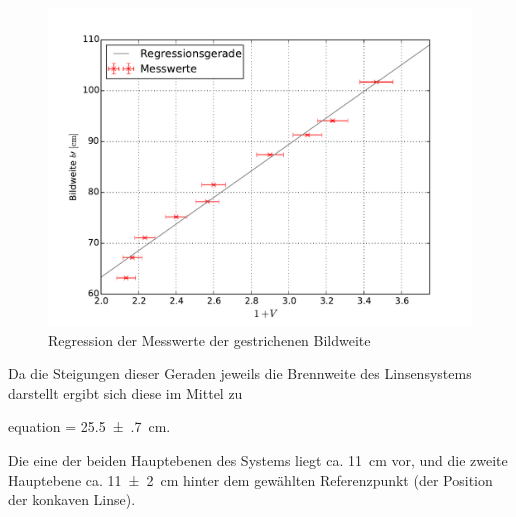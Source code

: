 	\begin{figure}[!h]
		\centering
		\includegraphics[scale=.7]{Grafiken/Messwerte_Abbe1.pdf}
		\caption{Regression der Messwerte der gestrichenen Bildweite\label{fig:Auswertung_AbbeB}}
	\end{figure}
	
	
	
	
	Da die Steigungen dieser Geraden jeweils die Brennweite des Linsensystems darstellt ergibt sich
	diese im Mittel zu
 	\begin{empheq}{equation}
 		\label{val:Auswertung_Abbe}
 		 = \SI{25.5(7)}{\centi\meter}.
 	\end{empheq}
 	
 	Die eine der beiden Hauptebenen des Systems liegt ca. \SI{11}{\centi\meter} vor,
 	und die zweite Hauptebene ca. \SI{11(2)}{\centi\meter} hinter dem gewählten 
 	Referenzpunkt (der Position der konkaven Linse).  
 	